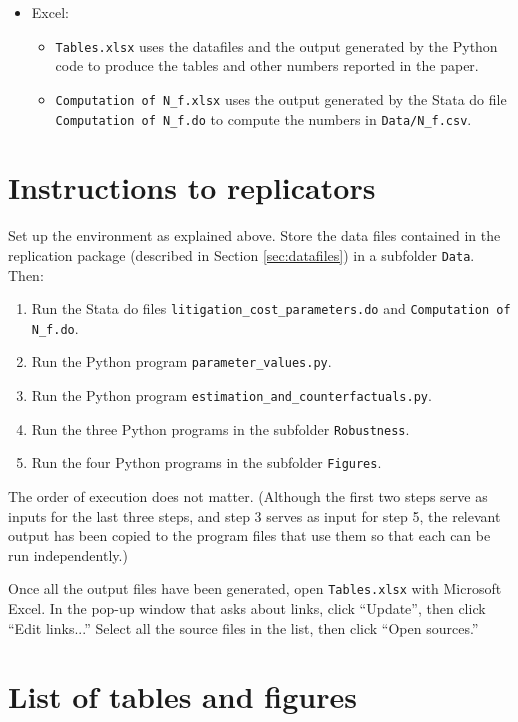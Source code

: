 \documentclass[a4paper,11pt]{article}
\begin{document}
\begin{itemize}
\begin{itemize}
  \end{itemize}
  \item Excel:
  \begin{itemize}
    \item \texttt{Tables.xlsx} uses the datafiles and the output generated by the Python code to produce the tables and other numbers reported in the paper.
    \item \texttt{Computation of N_f.xlsx} uses the output generated by the Stata do file \texttt{Computation of N_f.do} to compute the numbers in \texttt{Data/N_f.csv}.
  \end{itemize}
\end{itemize}

\section{Instructions to replicators}

Set up the environment as explained above. Store the data files contained in the replication package (described in Section \ref{sec:datafiles}) in a subfolder \texttt{Data}. Then:
\begin{enumerate}
  \item Run the Stata do files \texttt{litigation_cost_parameters.do} and \texttt{Computation of N_f.do}.
  \item Run the Python program \texttt{parameter_values.py}.
  \item Run the Python program \texttt{estimation_and_counterfactuals.py}.
  \item Run the three Python programs in the subfolder \texttt{Robustness}.
  \item Run the four Python programs in the subfolder \texttt{Figures}.
  \end{enumerate}
The order of execution does not matter. (Although the first two steps serve as inputs for the last three steps, and step 3 serves as input for step 5, the relevant output has been copied to the program files that use them so that each can be run independently.)

Once all the output files have been generated, open \texttt{Tables.xlsx} with Microsoft Excel. In the pop-up window that asks about links, click ``Update'', then click ``Edit links...'' Select all the source files in the list, then click ``Open sources.''

\pagebreak

\section{List of tables and figures}
\end{document}
